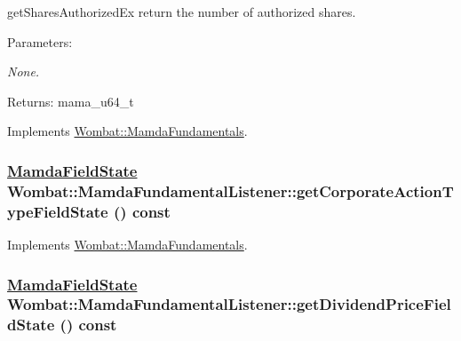 get\-Shares\-Authorized\-Ex return the number of authorized shares. 

\begin{Desc}
\item[Parameters:]
\begin{description}
\item[{\em None.}]\end{description}
\end{Desc}
\begin{Desc}
\item[Returns:]mama\_\-u64\_\-t \end{Desc}


Implements \hyperlink{classWombat_1_1MamdaFundamentals_20aba7aa488e92f4ef85e763ca9264a7}{Wombat::Mamda\-Fundamentals}.\hypertarget{classWombat_1_1MamdaFundamentalListener_990406da217bef790753e65c47d558df}{
\subsubsection[getCorporateActionTypeFieldState]{\setlength{\rightskip}{0pt plus 5cm}\hyperlink{namespaceWombat_93aac974f2ab713554fd12a1fa3b7d2a}{Mamda\-Field\-State} Wombat::Mamda\-Fundamental\-Listener::get\-Corporate\-Action\-Type\-Field\-State () const}}
\label{classWombat_1_1MamdaFundamentalListener_990406da217bef790753e65c47d558df}




Implements \hyperlink{classWombat_1_1MamdaFundamentals_73d57275845df72b4c389c7081e7170d}{Wombat::Mamda\-Fundamentals}.\hypertarget{classWombat_1_1MamdaFundamentalListener_8b5f8895f97cf0e559325348e99bc1bb}{
\subsubsection[getDividendPriceFieldState]{\setlength{\rightskip}{0pt plus 5cm}\hyperlink{namespaceWombat_93aac974f2ab713554fd12a1fa3b7d2a}{Mamda\-Field\-State} Wombat::Mamda\-Fundamental\-Listener::get\-Dividend\-Price\-Field\-State () const}}
\label{classWombat_1_1MamdaFundamentalListener_8b5f8895f97cf0e559325348e99bc1bb}




